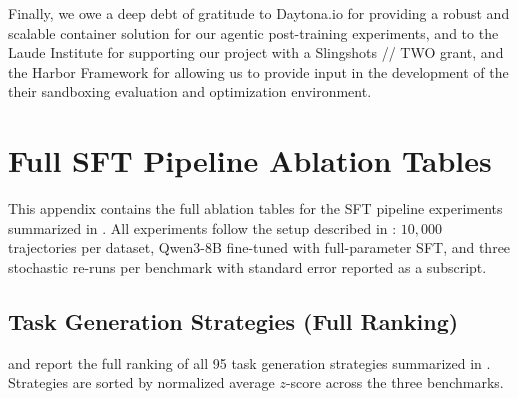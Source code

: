 \documentclass{article}
\begin{document}
\begin{ack}
Finally, we owe a deep debt of gratitude to Daytona.io for providing a robust and scalable container solution for our agentic post-training experiments, and to the Laude Institute for supporting our project with a Slingshots // TWO grant, and the Harbor Framework for allowing us to provide input in the development of the their sandboxing evaluation and optimization environment.
\end{ack}






\appendix

\newpage
\clearpage

\startcontents[sections]

\clearpage

\section{Full SFT Pipeline Ablation Tables}
\label{app:sft-ablations-full}

This appendix contains the full ablation tables for the SFT pipeline experiments summarized in . All experiments follow the setup described in : $10{,}000$ trajectories per dataset, Qwen3-8B fine-tuned with full-parameter SFT, and three stochastic re-runs per benchmark with standard error reported as a subscript.

\subsection{Task Generation Strategies (Full Ranking)}
\label{app:task-gen-full}

 and  report the full ranking of all 95 task generation strategies summarized in . Strategies are sorted by normalized average $z$-score across the three benchmarks.
\end{document}
